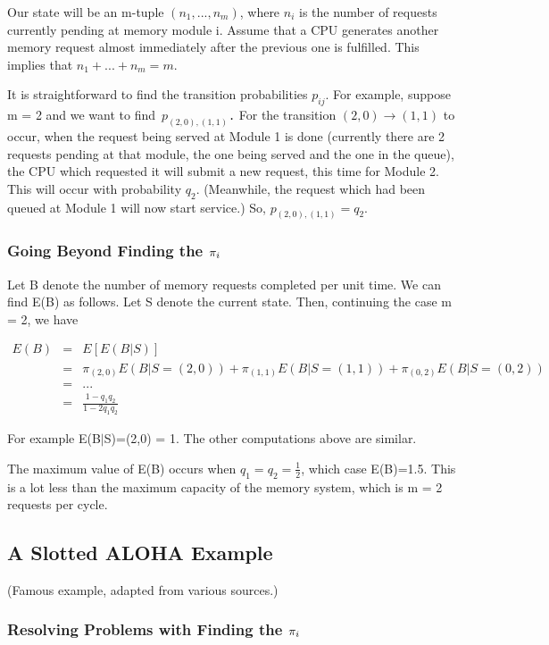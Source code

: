 \documentclass[11pt]{article}
\begin{document}
Our state will be an m-tuple $(n_{1},...,n_{m})$, where $n_{i}$ 
is the number of requests currently pending at memory module i. Assume
that a CPU generates another memory request almost immediately after the
previous one is fulfilled. This implies that $n_{1}+...+n_{m}=m$.

It is straightforward to find the transition probabilities $p_{ij}$.
For example, suppose m = 2 and we want to find~\texttt{$
p_{(2,0),(1,1)}$.} For the transition $(2,0)\rightarrow (1,1)$ to occur,
when the request being served at Module 1 is done (currently there are 2
requests pending at that module, the one being served and the one in the
queue), the CPU which requested it will submit a new request, this time
for Module 2. This will occur with probability $q_{2}$.  (Meanwhile, the
request which had been queued at Module 1 will now start service.) So,
$p_{(2,0),(1,1)}=q_{2}$.

\subsubsection{Going Beyond Finding the \protect\protect\protect$\pi_{i}\protect \protect \protect$}

Let B denote the number of memory requests completed per unit time. We
can find E(B) as follows. Let S denote the current state. Then,
continuing the case m = 2, we have 

\begin{eqnarray}
E(B) & = & E[E(B|S)] \nonumber \\
 & = & \pi_{(2,0)}E(B|S=(2,0))+\pi_{(1,1)}E(B|S=(1,1))+\pi_{(0,2)}E(B|S=(0,2)) \nonumber \\
 & = & ... \nonumber \\
 & = & \frac{1-q_{1}q_{2}}{1-2q_{1}q_{2}}
\end{eqnarray}

For example E(B$|$S)=(2,0) = 1.  The other computations above are
similar.

The maximum value of E(B) occurs when $q_{1}=q_{2}=\frac{1}{2}$,
which case E(B)=1.5. This is a lot less than the maximum capacity of the
memory system, which is m = 2 requests per cycle.

\subsection{A Slotted ALOHA Example}

(Famous example, adapted from various sources.)

\subsubsection{Resolving Problems with Finding the
\protect\protect\protect$\pi_{i}\protect \protect \protect $}
\end{document}
